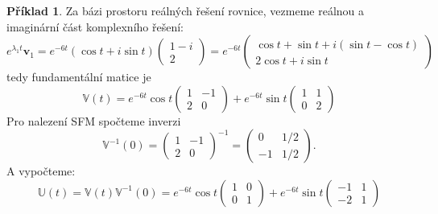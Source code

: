 \documentclass[a4paper, 12pt]{book}
\theoremstyle{definition}
\newtheorem{example}[theorem]{Příklad}
\def\vc#1{\mathbf{\boldsymbol{#1}}}     %
\def\tn#1{{\mathbb{#1}}}    %
\begin{document}
\begin{example}
Za bázi prostoru reálných řešení rovnice, vezmeme reálnou a imaginární část komplexního řešení:
\[
  e^{\lambda_1 t} \vc v_1
  =e^{-6t}(\cos t+i\sin t)\begin{pmatrix}1-i\\2\end{pmatrix}
  =e^{-6t}\begin{pmatrix}\cos t+\sin t+i(\sin t-\cos t)\\
   2\cos t+i \sin t\end{pmatrix}
\]
tedy fundamentální matice je 
\[
  \tn V(t)=e^{-6t}\cos t \begin{pmatrix} 1 & -1\\ 2 & 0 \end{pmatrix}
          +e^{-6t}\sin t \begin{pmatrix} 1 & 1\\ 0 & 2 \end{pmatrix}
\]
Pro nalezení SFM spočteme inverzi
\[
 \tn V^{-1}(0) = \begin{pmatrix} 1 & -1\\ 2 & 0 \end{pmatrix}^{-1} =
 \begin{pmatrix} 0 & 1/2\\ -1 & 1/2 \end{pmatrix}.
\]
A vypočteme:
\[
  \tn U(t) = \tn V(t)\tn V^{-1}(0) = 
    e^{-6t}\cos t \begin{pmatrix} 1 & 0\\ 0 & 1 \end{pmatrix}
   +e^{-6t}\sin t \begin{pmatrix} -1 & 1\\ -2 & 1 \end{pmatrix}
\]

\end{example}
\end{document}
